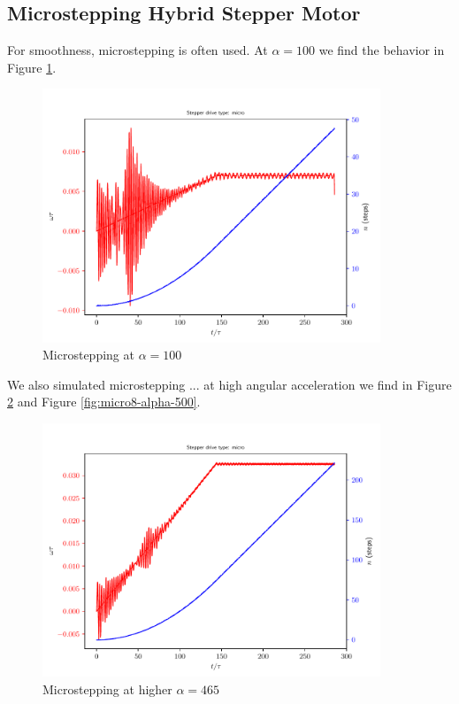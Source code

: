 \documentclass{article}
\begin{document}
\subsection{Microstepping Hybrid Stepper Motor}
For smoothness, microstepping is often used. At $\alpha=100$ we find the behavior in Figure \ref{fig:micro8-alpha-100}.
\begin{figure}[h!]
  \centering
  \includegraphics[width=0.9\textwidth]{simfigs/fig1-2018-10-20T14-18-54-micro8-alpha-100.pdf}
  \captionsetup{justification=centering}
  \caption{Microstepping at $\alpha=100$}
   \label{fig:micro8-alpha-100}
\end{figure}
We also simulated microstepping ... at high angular acceleration we find in Figure \ref{fig:micro8-alpha-465} and Figure \ref{fig:micro8-alpha-500}.
\begin{figure}[h!]
  \centering
  \includegraphics[width=0.9\textwidth]{simfigs/fig1-2018-10-20T14-32-16-micro8-alpha-465.pdf}
  \captionsetup{justification=centering}
  \caption{Microstepping at higher $\alpha = 465$}
   \label{fig:micro8-alpha-465}
\end{figure}
\end{document}
